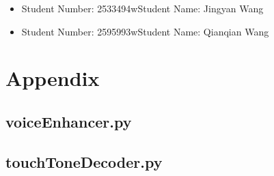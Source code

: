 \documentclass[a4paper,12pt]{article}
\begin{document}
\begin{itemize}
	\item Student Number: 2533494w\space Student Name: Jingyan Wang
	\item Student Number: 2595993w\space Student Name: Qianqian Wang
\end{itemize}

\clearpage
\section{Appendix}

\subsection{voiceEnhancer.py}

\subsection{touchToneDecoder.py}

\end{document}
